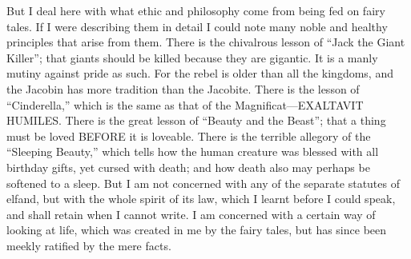 But I deal here with what ethic and philosophy come from being fed on fairy tales. If I were describing them in detail I could note many noble and healthy principles that arise from them. There is the chivalrous lesson of “Jack the Giant Killer”; that giants should be killed because they are gigantic. It is a manly mutiny against pride as such. For the rebel is older than all the kingdoms, and the Jacobin has more tradition than the Jacobite. There is the lesson of “Cinderella,” which is the same as that of the Magnificat—EXALTAVIT HUMILES. There is the great lesson of “Beauty and the Beast”; that a thing must be loved BEFORE it is loveable. There is the terrible allegory of the “Sleeping Beauty,” which tells how the human creature was blessed with all birthday gifts, yet cursed with death; and how death also may perhaps be softened to a sleep. But I am not concerned with any of the separate statutes of elfand, but with the whole spirit of its law, which I learnt before I could speak, and shall retain when I cannot write. I am concerned with a certain way of looking at life, which was created in me by the fairy tales, but has since been meekly ratified by the mere facts.

